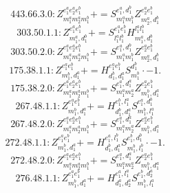 \documentclass[letterpaper,10pt,fleqn,leqno,onecolumn]{article}
\begin{document}
\begin{equation} \;\;\;\;\;\;  443.66.3.0: Z^{e_{1}^{a}e_{2}^{a}e_{1}^{b}}_{m_{1}^{a}m_{2}^{a}m_{1}^{b}}+=S^{e_{1}^{a},d_{1}^{b}}_{m_{1}^{a}m_{1}^{b}}Z^{e_{2}^{a}e_{1}^{b}}_{m_{2}^{a},d_{1}^{b}} \end{equation}
\begin{equation} \;\;\;\;\;\;  303.50.1.1: Z^{e_{1}^{a}e_{1}^{b}}_{m_{1}^{a},d_{1}^{b}}+=S^{e_{1}^{a}e_{1}^{b}}_{l_{1}^{a}l_{1}^{b}}H^{l_{1}^{a}l_{1}^{b}}_{m_{1}^{a},d_{1}^{b}} \end{equation}
\begin{equation} \;\;\;\;\;\;  303.50.2.0: Z^{e_{1}^{a}e_{2}^{a}e_{1}^{b}}_{m_{1}^{a}m_{2}^{a}m_{1}^{b}}+=S^{e_{1}^{a},d_{1}^{b}}_{m_{1}^{a}m_{1}^{b}}Z^{e_{2}^{a}e_{1}^{b}}_{m_{2}^{a},d_{1}^{b}} \end{equation}
\begin{equation} \;\;\;\;\;\;  175.38.1.1: Z^{e_{1}^{a}e_{1}^{b}}_{m_{1}^{b},d_{1}^{a}}+=H^{e_{1}^{a}e_{1}^{b}}_{d_{1}^{b},d_{1}^{a}}S^{d_{1}^{b}}_{m_{1}^{b}}\cdot -1. \end{equation}
\begin{equation} \;\;\;\;\;\;  175.38.2.0: Z^{e_{1}^{a}e_{2}^{a}e_{1}^{b}}_{m_{1}^{a}m_{2}^{a}m_{1}^{b}}+=S^{e_{1}^{a},d_{1}^{a}}_{m_{1}^{a}m_{2}^{a}}Z^{e_{2}^{a}e_{1}^{b}}_{m_{1}^{b},d_{1}^{a}} \end{equation}
\begin{equation} \;\;\;\;\;\;  267.48.1.1: Z^{e_{1}^{a}e_{1}^{b}}_{m_{1}^{b},d_{1}^{a}}+=H^{e_{1}^{b},l_{1}^{a}}_{d_{1}^{b},d_{1}^{a}}S^{e_{1}^{a},d_{1}^{b}}_{m_{1}^{b},l_{1}^{a}} \end{equation}
\begin{equation} \;\;\;\;\;\;  267.48.2.0: Z^{e_{1}^{a}e_{2}^{a}e_{1}^{b}}_{m_{1}^{a}m_{2}^{a}m_{1}^{b}}+=S^{e_{1}^{a},d_{1}^{a}}_{m_{1}^{a}m_{2}^{a}}Z^{e_{2}^{a}e_{1}^{b}}_{m_{1}^{b},d_{1}^{a}} \end{equation}
\begin{equation} \;\;\;\;\;\;  272.48.1.1: Z^{e_{1}^{a}e_{1}^{b}}_{m_{1}^{b},d_{1}^{a}}+=H^{e_{1}^{a},l_{1}^{b}}_{d_{1}^{b},d_{1}^{a}}S^{e_{1}^{b},d_{1}^{b}}_{m_{1}^{b},l_{1}^{b}}\cdot -1. \end{equation}
\begin{equation} \;\;\;\;\;\;  272.48.2.0: Z^{e_{1}^{a}e_{2}^{a}e_{1}^{b}}_{m_{1}^{a}m_{2}^{a}m_{1}^{b}}+=S^{e_{1}^{a},d_{1}^{a}}_{m_{1}^{a}m_{2}^{a}}Z^{e_{2}^{a}e_{1}^{b}}_{m_{1}^{b},d_{1}^{a}} \end{equation}
\begin{equation} \;\;\;\;\;\;  276.48.1.1: Z^{e_{1}^{a}e_{1}^{b}}_{m_{1}^{b},d_{1}^{a}}+=H^{e_{1}^{a},l_{1}^{a}}_{d_{1}^{a},d_{2}^{a}}S^{e_{1}^{b},d_{2}^{a}}_{m_{1}^{b},l_{1}^{a}} \end{equation}
\end{document}
